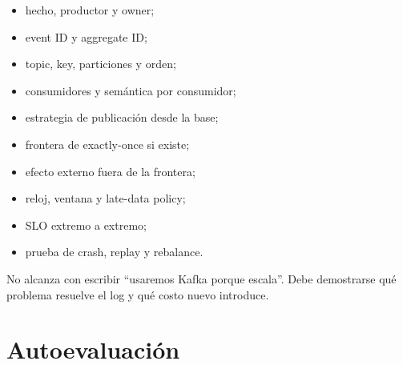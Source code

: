 \documentclass[variant=apuntes,cover=institutional,mode=screen]{ua-engineering-v6-article}
\begin{document}
\begin{itemize}
\item hecho, productor y owner;
\item event ID y aggregate ID;
\item topic, key, particiones y orden;
\item consumidores y semántica por consumidor;
\item estrategia de publicación desde la base;
\item frontera de exactly-once si existe;
\item efecto externo fuera de la frontera;
\item reloj, ventana y late-data policy;
\item SLO extremo a extremo;
\item prueba de crash, replay y rebalance.
\end{itemize}

No alcanza con escribir ``usaremos Kafka porque escala''. Debe demostrarse qué problema resuelve el log y qué costo nuevo introduce.

\section{Autoevaluación}
\end{document}
